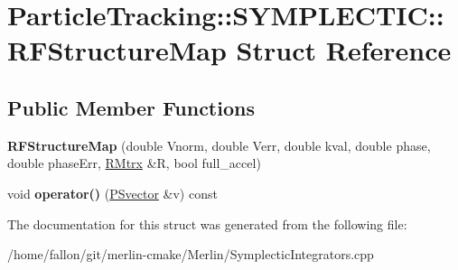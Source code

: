 \hypertarget{structParticleTracking_1_1SYMPLECTIC_1_1RFStructureMap}{}\section{Particle\+Tracking\+:\+:S\+Y\+M\+P\+L\+E\+C\+T\+IC\+:\+:R\+F\+Structure\+Map Struct Reference}
\label{structParticleTracking_1_1SYMPLECTIC_1_1RFStructureMap}
\subsection*{Public Member Functions}
\begin{DoxyCompactItemize}
\item 
\mbox{\label{structParticleTracking_1_1SYMPLECTIC_1_1RFStructureMap_aa13d5a2414c564eaace8d2a322f20876}} 
{\bfseries R\+F\+Structure\+Map} (double Vnorm, double Verr, double kval, double phase, double phase\+Err, \hyperlink{classRMtrx}{R\+Mtrx} \&R, bool full\+\_\+accel)
\item 
\mbox{\label{structParticleTracking_1_1SYMPLECTIC_1_1RFStructureMap_aa1110cdeb952f534f500ca26d9cd9591}} 
void {\bfseries operator()} (\hyperlink{classPSvector}{P\+Svector} \&v) const
\end{DoxyCompactItemize}


The documentation for this struct was generated from the following file\+:\begin{DoxyCompactItemize}
\item 
/home/fallon/git/merlin-\/cmake/\+Merlin/Symplectic\+Integrators.\+cpp\end{DoxyCompactItemize}

